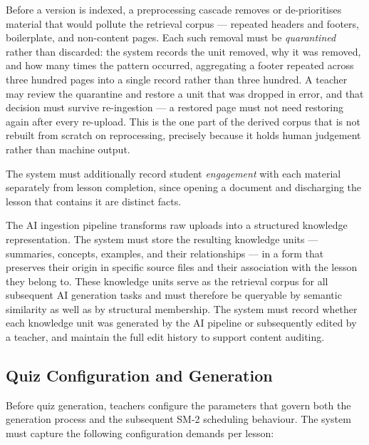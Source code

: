 Before a version is indexed, a preprocessing cascade removes or
de-prioritises material that would pollute the retrieval corpus —
repeated headers and footers, boilerplate, and non-content pages. Each
such removal must be \textit{quarantined} rather than discarded: the
system records the unit removed, why it was removed, and how many
times the pattern occurred, aggregating a footer repeated across three
hundred pages into a single record rather than three hundred. A
teacher may review the quarantine and restore a unit that was dropped
in error, and that decision must survive re-ingestion — a restored
page must not need restoring again after every re-upload. This is the
one part of the derived corpus that is not rebuilt from scratch on
reprocessing, precisely because it holds human judgement rather than
machine output.

The system must additionally record student \textit{engagement} with
each material separately from lesson completion, since opening a
document and discharging the lesson that contains it are distinct
facts.

The AI ingestion pipeline transforms raw uploads into a structured 
knowledge representation. The system must store the resulting 
knowledge units — summaries, concepts, examples, and their 
relationships — in a form that preserves their origin in specific 
source files and their association with the lesson they belong to. 
These knowledge units serve as the retrieval corpus for all subsequent 
AI generation tasks and must therefore be queryable by semantic 
similarity as well as by structural membership. The system must record 
whether each knowledge unit was generated by the AI pipeline or 
subsequently edited by a teacher, and maintain the full edit history 
to support content auditing.

\subsection{Quiz Configuration and Generation}

Before quiz generation, teachers configure the parameters that 
govern both the generation process and the subsequent SM-2 scheduling 
behaviour. The system must capture the following configuration demands 
per lesson:


